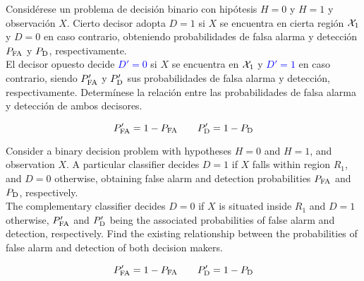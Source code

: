 \ifspanish

\question Considérese un problema de decisión binario con hipótesis $H=0$ y $H=1$ y observación $X$. Cierto decisor adopta $D=1$ si $X$ se encuentra en {cierta} región {${\cal X}_1$} y $D=0$ en caso contrario, obteniendo probabilidades de falsa alarma y detección $P_{\rm FA}$ y $P_{\rm D}$, respectivamente.\\
El decisor opuesto decide \textcolor{blue}{$D'=0$} si $X$ se encuentra en {${\cal X}_1$} y \textcolor{blue}{$D'=1$} en caso contrario, siendo $P_{\rm FA}'$ y $P_{\rm D}'$ sus probabilidades de falsa alarma y detección, respectivamente.  Determínese la relación entre las probabilidades de falsa alarma y detección de ambos decisores.\\
\begin{solution} 
$$P_{\rm FA}'=1-P_{\rm FA} \quad \quad P_{\rm D}'=1-P_{\rm D}$$
\end{solution}

\else

\question Consider a binary decision problem with hypotheses $H=0$ and $H=1$, and observation $X$.  A particular classifier decides $D=1$ if $X$ falls within region $R_1$, and $D=0$ otherwise, obtaining false alarm and detection probabilities $P_{\rm FA}$ and $P_{\rm D}$, respectively.\\
The complementary classifier decides $D=0$ if $X$ is situated inside $R_1$ and $D=1$ otherwise, $P_{\rm FA}'$ and $P_{\rm D}'$ being the associated probabilities of false alarm and detection, respectively.  Find the existing relationship between the probabilities of false alarm and detection of both decision makers.\\

\begin{solution}
$$P_{\rm FA}'=1-P_{\rm FA} \quad \quad P_{\rm D}'=1-P_{\rm D}$$
\end{solution}

\fi